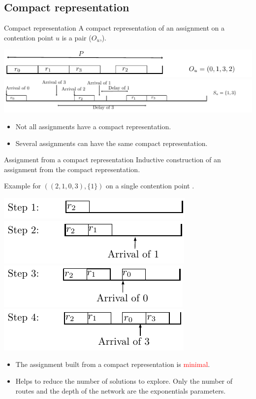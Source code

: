 \documentclass[10 pt]{beamer}
\begin{document}
\subsection{Compact representation}
\begin{frame}{Compact representation}
A compact representation of an assignment on a contention point $u$ is a pair ($O_u$,).

	\includegraphics[width=0.65\linewidth]{order}
  \pause
  \includegraphics[width=\linewidth]{subset}


\pause
\begin{itemize}
  \item Not all assignments have a compact representation.
  \pause
  \item Several assignments can have the same compact representation.
  \end{itemize}
\end{frame}
\begin{frame}{Assignment from a compact representation }
Inductive construction of an assignment from the compact representation. 

Example for $((2,1,0,3),\{1\})$ on a single contention point .


	\includegraphics[width=0.5\linewidth]{compacttoassignment1}
\pause
\includegraphics[width=0.5\linewidth]{compacttoassignment2}
\pause
\includegraphics[width=0.5\linewidth]{compacttoassignment3}
\pause
\includegraphics[width=0.5\linewidth]{compacttoassignment4}
\pause

\begin{itemize}
  \item The assignment built from a compact representation is \textcolor{red}{minimal}.
  \pause

  \item Helps to reduce the number of solutions to explore. Only the number of routes and the depth of the network are the exponentials parameters.
  \end{itemize}
\end{frame}
\end{document}
